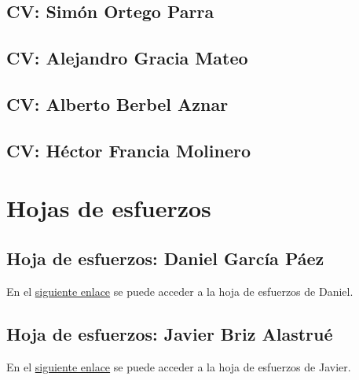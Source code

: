 \documentclass[10pt,spanish]{article}
\let\stdsection\section
\renewcommand\section{\newpage\stdsection}
\newcommand{\hojaesfuerzos}[2]{\href{run:xls/#1.xls}{#2}}
\begin{document}
\subsection{CV: Simón Ortego Parra}


\subsection{CV: Alejandro Gracia Mateo}


\subsection{CV: Alberto Berbel Aznar}


\subsection{CV: Héctor Francia Molinero}



\section{Hojas de esfuerzos}
%
%
\subsection{Hoja de esfuerzos: Daniel García Páez}
%
En el \hojaesfuerzos{b_1_hoja_de_esfuerzos_daniel}{siguiente enlace} se puede acceder a la hoja de 
esfuerzos de Daniel.

\subsection{Hoja de esfuerzos: Javier Briz Alastrué}
%
En el \hojaesfuerzos{b_2_hoja_de_esfuerzos_javier}{siguiente enlace} se puede acceder a la hoja de 
esfuerzos de Javier.
\end{document}
